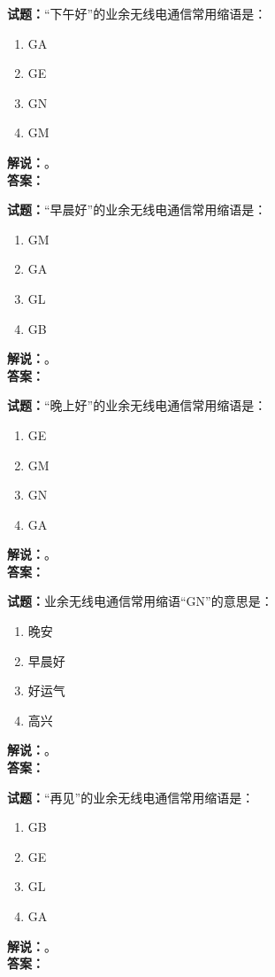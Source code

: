 \documentclass{ctexbook}
\begin{document}
\bigskip

\noindent\textbf{试题：}“下午好”的业余无线电通信常用缩语是：
\begin{enumerate}[leftmargin=3em]
  \item GA
  \item GE
  \item GN
  \item GM
\end{enumerate}
\noindent\textbf{解说：}\textbf{}。\\\noindent\textbf{答案：}

\bigskip

\noindent\textbf{试题：}“早晨好”的业余无线电通信常用缩语是：
\begin{enumerate}[leftmargin=3em]
  \item GM
  \item GA
  \item GL
  \item GB
\end{enumerate}
\noindent\textbf{解说：}\textbf{}。\\\noindent\textbf{答案：}

\bigskip

\noindent\textbf{试题：}“晚上好”的业余无线电通信常用缩语是：
\begin{enumerate}[leftmargin=3em]
  \item GE
  \item GM
  \item GN
  \item GA
\end{enumerate}
\noindent\textbf{解说：}\textbf{}。\\\noindent\textbf{答案：}

\bigskip

\noindent\textbf{试题：}业余无线电通信常用缩语“GN”的意思是：
\begin{enumerate}[leftmargin=3em]
  \item 晚安
  \item 早晨好
  \item 好运气
  \item 高兴
\end{enumerate}
\noindent\textbf{解说：}\textbf{}。\\\noindent\textbf{答案：}

\bigskip

\noindent\textbf{试题：}“再见”的业余无线电通信常用缩语是：
\begin{enumerate}[leftmargin=3em]
  \item GB
  \item GE
  \item GL
  \item GA
\end{enumerate}
\noindent\textbf{解说：}\textbf{}。\\\noindent\textbf{答案：}
\end{document}
